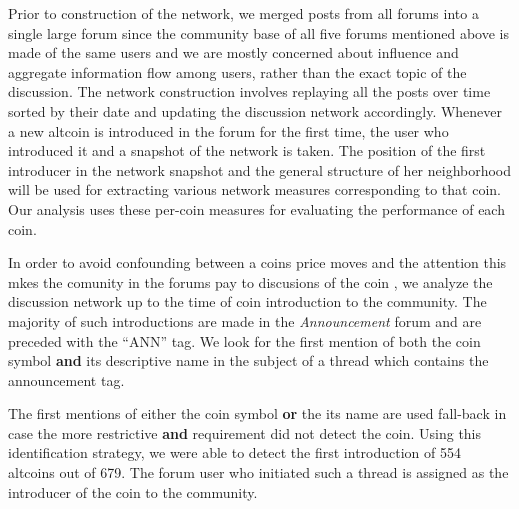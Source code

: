 Prior to construction of the network, we merged posts from all forums into a
single large forum since the community base of all five forums mentioned
above is made of the same users and we are mostly concerned about influence and
aggregate information flow among users, rather than the exact topic of the discussion.
The network construction involves replaying all the posts over time sorted by their date and updating the
discussion network accordingly. Whenever a new altcoin is introduced
in the forum for the first time, the user who introduced it and a snapshot of the network is taken.
The position of the first introducer in the network snapshot and the general structure of her neighborhood
will be used for extracting various network measures corresponding to that coin. Our analysis
uses these per-coin measures for evaluating the performance of each coin.


In order to avoid confounding between a coins price moves and the attention this mkes the comunity in the forums pay to discusions of the coin , we analyze the discussion network up to the time of coin introduction to the community.
The  majority of such introductions are made in the \textit{Announcement} forum and are preceded with the ``ANN'' tag.
We look for the first mention of both the coin symbol \textbf{and} its descriptive name in the subject of a thread which contains the announcement tag. 

The first mentions of either the coin symbol \textbf{or} the its name are used fall-back in case the more restrictive \textbf{and} requirement did not detect the coin. 
Using this identification strategy, we were able to detect the first introduction of 554 altcoins out of 679.
The forum user who initiated such a thread is assigned as the  introducer of the coin to the community.
